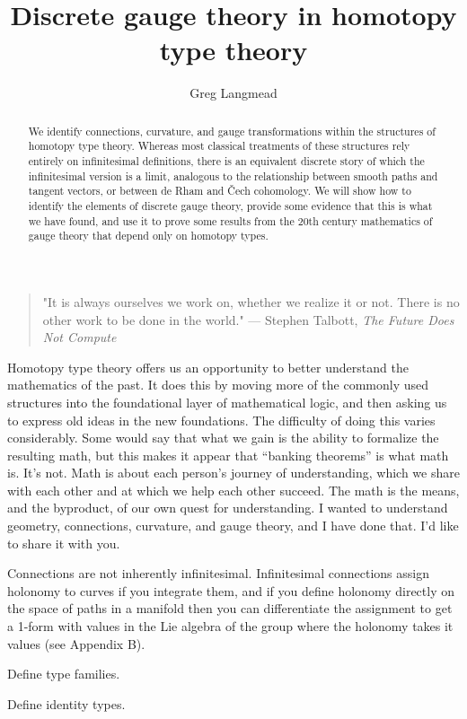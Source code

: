 \documentclass[12pt]{article}
\title{Discrete gauge theory in homotopy type theory}
\author{Greg Langmead}
\begin{document}
\begin{abstract}
We identify connections, curvature, and gauge transformations within the structures of homotopy type theory. Whereas most classical treatments of these structures rely entirely on infinitesimal definitions, there is an equivalent discrete story of which the infinitesimal version is a limit, analogous to the relationship between smooth paths and tangent vectors, or between de Rham and Čech cohomology. We will show how to identify the elements of discrete gauge theory, provide some evidence that this is what we have found, and use it to prove some results from the 20th century mathematics of gauge theory that depend only on homotopy types.
\end{abstract}


\begin{quote} 
\centering 
"It is always ourselves we work on, whether we realize it or not. There is no other work to be done in the world." --- Stephen Talbott, \emph{The Future Does Not Compute}\cite{talbott}
\end{quote}

Homotopy type theory offers us an opportunity to better understand the mathematics of the past. It does this by moving more of the commonly used structures into the foundational layer of mathematical logic, and then asking us to express old ideas in the new foundations. The difficulty of doing this varies considerably. Some would say that what we gain is the ability to formalize the resulting math, but this makes it appear that ``banking theorems'' is what math is. It's not. Math is about each person's journey of understanding, which we share with each other and at which we help each other succeed. The math is the means, and the byproduct, of our own quest for understanding. I wanted to understand geometry, connections, curvature, and gauge theory, and I have done that. I'd like to share it with you.

Connections are not inherently infinitesimal. Infinitesimal connections assign holonomy to curves if you integrate them, and if you define holonomy directly on the space of paths in a manifold then you can differentiate the assignment to get a 1-form with values in the Lie algebra of the group where the holonomy takes it values (see \cite{freed1992classical} Appendix B).

Define type families.

Define identity types.
\end{document}
